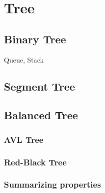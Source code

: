 \chapter{Tree}


\section{Binary Tree}
Queue, Stack

\section{Segment Tree}

\section{Balanced Tree}

\subsection{AVL Tree}

\subsection{Red-Black Tree}

\subsection{Summarizing properties}


